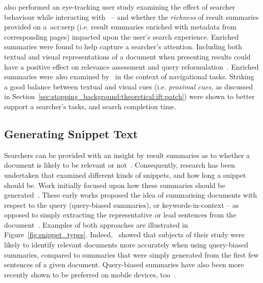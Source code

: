 \cite{marcos2015snippets_web_search} also performed an eye-tracking user study examining the effect of searcher behaviour while interacting with~ -- and whether the \emph{richness} of result summaries provided on a~\gls{acr:serp} (i.e. result summaries enriched with metadata from corresponding pages) impacted upon the user's search experience. Enriched summaries were found to help capture a searcher's attention. Including both textual and visual representations of a document when presenting results could have a positive effect on relevance assessment and query reformulation~\citep{joho2006presentation}. Enriched summaries were also examined by~\cite{ali2009interaction_interfaces} in the context of navigational tasks. Striking a good balance between textual and visual cues (i.e. \emph{proximal cues,} as discussed in Section~\ref{sec:stopping_background:theoretical:ift:patch}) were shown to better support a searcher's tasks, and search completion time.

\subsection{Generating Snippet Text}\label{chap:snippets:background:generating}
Searchers can be provided with an insight by result summaries as to whether a document is likely to be relevant or not~\cite{he2012bridging}. Consequently, research has been undertaken that examined different kinds of snippets, and how long a snippet should be. Work initially focused upon how these summaries should be generated~\citep{pedersen1991snippet, landauer1993enhancing, tombros1998query_biased, white2003task, leal2015query}. These early works proposed the idea of summarising documents with respect to the query (query-biased summaries), or keywords-in-context -- as opposed to simply extracting the representative or lead sentences from the document~\citep{kupiec1995tds}. Examples of both approaches are illustrated in Figure~\ref{fig:snippet_types}. Indeed,~\cite{tombros1998query_biased} showed that subjects of their study were likely to identify relevant documents more accurately when using query-biased summaries, compared to summaries that were simply generated from the first few sentences of a given document. Query-biased summaries have also been more recently shown to be preferred on mobile devices, too~\citep{spirin2016snippets}.

